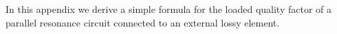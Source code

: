 In this appendix we derive a simple formula for the loaded quality factor of a parallel resonance circuit connected to an external lossy element.


